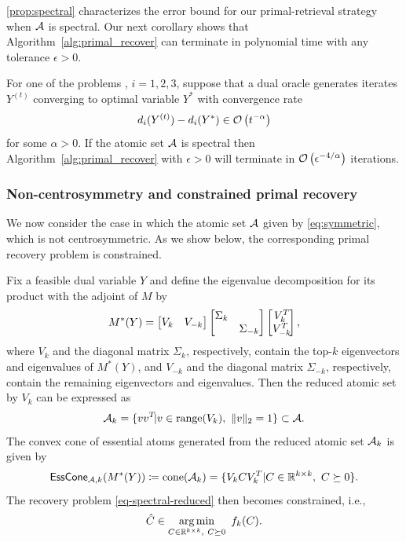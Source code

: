 \autoref{prop:spectral} characterizes the error bound for our primal-retrieval strategy when $\mathcal{A}$ is spectral. Our next corollary shows that Algorithm~\ref{alg:primal_recover} can terminate in polynomial time with any tolerance $\epsilon > 0$. 

\begin{corollary} \label{coro:spectral}
  For one of the problems \Drobi, $i=1,2,3$, suppose that a dual oracle generates iterates $Y^{(t)}$ converging to optimal variable $Y^*$ with convergence rate
  \[d_i(Y^{(t)}) - d_i(Y^*) \in \mathcal{O}\left( t^{-\alpha} \right)\]
  for some $\alpha > 0$. If the atomic set $\mathcal{A}$ is spectral then Algorithm~\ref{alg:primal_recover} with $\epsilon>0$ will terminate in $\mathcal{O}\left(\epsilon^{-4/\alpha}\right)$ iterations. 
\end{corollary}

\subsubsection{Non-centrosymmetry and constrained primal recovery} \label{sec:symmetric-matrices}

We now consider the case in which the atomic set $\mathcal{A}$ given by \eqref{eq:symmetric}, which is not centrosymmetric. As we show below, the corresponding primal recovery problem is constrained.

Fix a feasible dual variable $Y$ and define the eigenvalue decomposition for its product with the adjoint of $M$ by
\begin{equation}
   M^*(Y) = 
\begin{bmatrix}
    V_k & V_{-k}
\end{bmatrix}
\begin{bmatrix}
    \Sigma_k &          \\ 
             &  \Sigma_{-k}
\end{bmatrix}
\begin{bmatrix}
    V_k^T\! \\ 
    V_{-k}^T\!
\end{bmatrix},
\end{equation}
where $V_k$ and the diagonal matrix $\Sigma_k$, respectively, contain the top-$k$ eigenvectors and eigenvalues of $M^*(Y)$, and $V_{-k}$ and the diagonal matrix $\Sigma_{-k}$, respectively, contain the remaining eigenvectors and eigenvalues. Then the reduced atomic set by $V_k$ can be expressed as 
\[
  \mathcal{A}_k = \{ vv^T\! | v\in\operatorname{range}(V_k),\ \|v\|_2=1\} \subset \mathcal{A}.
\]
The convex cone of essential atoms generated from the reduced atomic set $\mathcal{A}_k$ is given by
\begin{equation} \label{eq:cone_spectral2}
    \operatorname{\sf EssCone}_{\mathcal{A}, k}(M^*(Y)) \coloneqq \operatorname{cone}(\mathcal{A}_k) = \{V_k C V_k^T | C \in \mathbb{R}^{k\times k},\ C \succeq 0\}.
\end{equation}
The recovery problem \eqref{eq-spectral-reduced} then becomes constrained, i.e., 
\[
  \hat C \in \underset{C\in\mathbb{R}^{k\times k},\ C \succeq 0}{\textrm{arg}\,{\min}}\enskip f_k(C).
\] 

